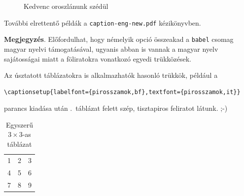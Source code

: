 \documentclass{article}
\begin{document}
\begin{figure}[!hbp]
  \begin{center}
  \end{center}
  \caption{Kedvenc oroszlánunk szédül}
  \label{figure-dizzylion}
\end{figure}

További elrettentő példák a \verb!caption-eng-new.pdf! kézikönyvben.

\textbf{Megjegyzés}. Előfordulhat, hogy némelyik opció összeakad a \verb!babel! csomag magyar nyelvi támogatásával, ugyanis abban is vannak a magyar nyelv sajátosságai miatt a föliratokra vonatkozó egyedi trükközések.

Az úsztatott  táblázatokra is alkalmazhatók hasonló trükkök, például a
\begin{verbatim}
\captionsetup{labelfont={pirosszamok,bf},textfont={pirosszamok,it}}
\end{verbatim}
parancs kiadása után .~táblázat felett szép, tisztapiros feliratot látunk. ;-)
\begin{table}[htp]
 \caption{Egyszerű $3\times3$-as táblázat}	
 \label{table-kicsi}
  \begin{center}
    \begin{tabular}{| l c r |}
    \hline
    1 & 2 & 3 \\
    4 & 5 & 6 \\
    7 & 8 & 9 \\
    \hline
    \end{tabular}
  \end{center}
\end{table}
%
\end{document}
